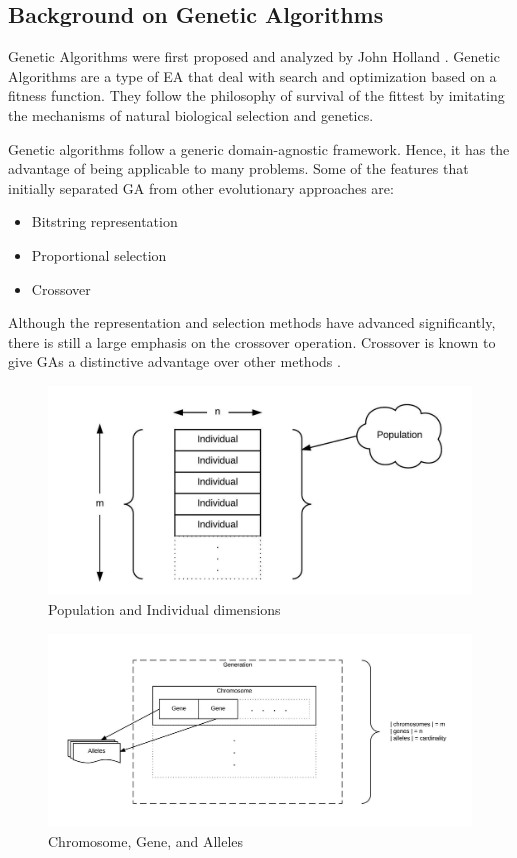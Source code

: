 \documentclass[12pt,a4paper]{article}
\begin{document}
	\subsection{Background on Genetic Algorithms}
	Genetic Algorithms were first proposed and analyzed by John Holland \cite{holland}. Genetic Algorithms are a type of EA that deal with search and optimization based on a fitness function. They follow the philosophy of survival of the fittest by imitating the mechanisms of natural biological selection and genetics. \par
	Genetic algorithms follow a generic domain-agnostic framework. Hence, it has the advantage of being applicable to many problems. Some of the features that initially separated GA from other evolutionary approaches are:
	\begin{itemize}	
	\item Bitstring representation
	\item Proportional selection
	\item Crossover
	\end{itemize}
	Although the representation and selection methods have advanced significantly, there is still a large emphasis on the crossover operation. Crossover is known to give GAs a distinctive advantage over other methods \cite{handbook}. \par
	
   	\begin{figure}[H]
   		\includegraphics[width=\textwidth]{"population"}
   		\caption{Population and Individual dimensions}
   		\centering
   		\label{fig:population}
   	\end{figure}
	
   	\begin{figure}[H]
   		\includegraphics[width=\textwidth]{"generation"}
   		\caption{Chromosome, Gene, and Alleles}
   		\centering
   		\label{fig:generation}
   	\end{figure}
\end{document}
